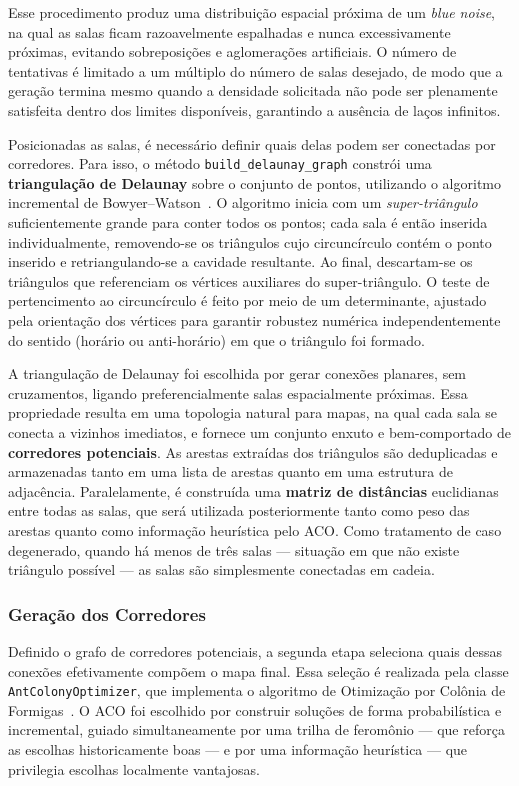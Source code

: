 \documentclass[12pt]{article}
\begin{document}
Esse procedimento produz uma distribuição espacial próxima de um \textit{blue noise}, na qual as salas ficam razoavelmente
espalhadas e nunca excessivamente próximas, evitando sobreposições e aglomerações artificiais. O número de tentativas é limitado
a um múltiplo do número de salas desejado, de modo que a geração termina mesmo quando a densidade solicitada não pode ser
plenamente satisfeita dentro dos limites disponíveis, garantindo a ausência de laços infinitos.
 
Posicionadas as salas, é necessário definir quais delas podem ser conectadas por corredores. Para isso, o método
\texttt{build\_delaunay\_graph} constrói uma \textbf{triangulação de Delaunay} sobre o conjunto de pontos, utilizando o algoritmo
incremental de Bowyer--Watson~\cite{REF_DELAUNAY}. O algoritmo inicia com um \textit{super-triângulo} suficientemente grande para
conter todos os pontos; cada sala é então inserida individualmente, removendo-se os triângulos cujo circuncírculo contém o ponto
inserido e retriangulando-se a cavidade resultante. Ao final, descartam-se os triângulos que referenciam os vértices auxiliares do
super-triângulo. O teste de pertencimento ao circuncírculo é feito por meio de um determinante, ajustado pela orientação dos
vértices para garantir robustez numérica independentemente do sentido (horário ou anti-horário) em que o triângulo foi formado.
 
A triangulação de Delaunay foi escolhida por gerar conexões planares, sem cruzamentos, ligando preferencialmente salas
espacialmente próximas. Essa propriedade resulta em uma topologia natural para mapas, na qual cada sala se conecta a vizinhos
imediatos, e fornece um conjunto enxuto e bem-comportado de \textbf{corredores potenciais}. As arestas extraídas dos triângulos
são deduplicadas e armazenadas tanto em uma lista de arestas quanto em uma estrutura de adjacência. Paralelamente, é construída
uma \textbf{matriz de distâncias} euclidianas entre todas as salas, que será utilizada posteriormente tanto como peso das arestas
quanto como informação heurística pelo ACO. Como tratamento de caso degenerado, quando há menos de três salas — situação em que
não existe triângulo possível — as salas são simplesmente conectadas em cadeia.
 
\subsubsection{Geração dos Corredores}
Definido o grafo de corredores potenciais, a segunda etapa seleciona quais dessas conexões efetivamente compõem o mapa final.
Essa seleção é realizada pela classe \texttt{AntColonyOptimizer}, que implementa o algoritmo de Otimização por Colônia de
Formigas~\cite{REF_ACO}. O ACO foi escolhido por construir soluções de forma probabilística e incremental, guiado simultaneamente
por uma trilha de feromônio — que reforça as escolhas historicamente boas — e por uma informação heurística — que privilegia
escolhas localmente vantajosas.
 
\end{document}
